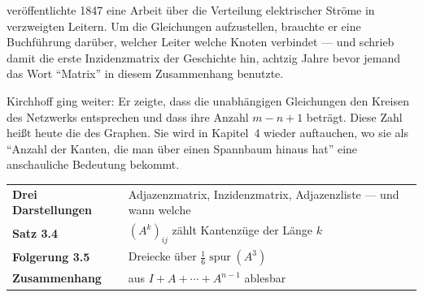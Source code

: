 \begin{geschichte}
 veröffentlichte 1847 eine Arbeit über die Verteilung elektrischer Ströme in verzweigten Leitern. Um die Gleichungen aufzustellen, brauchte er eine Buchführung darüber, welcher Leiter welche Knoten verbindet --- und schrieb damit die erste Inzidenzmatrix der Geschichte hin, achtzig Jahre bevor jemand das Wort \enquote{Matrix} in diesem Zusammenhang benutzte.

Kirchhoff ging weiter: Er zeigte, dass die unabhängigen Gleichungen den Kreisen des Netzwerks entsprechen und dass ihre Anzahl $m - n + 1$ beträgt. Diese Zahl heißt heute die  des Graphen. Sie wird in Kapitel~4 wieder auftauchen, wo sie als \enquote{Anzahl der Kanten, die man über einen Spannbaum hinaus hat} eine anschauliche Bedeutung bekommt.

\begin{center}
\begin{minipage}{0.9\textwidth}
\end{minipage}
\end{center}
\end{geschichte}

\begin{merksatz}
\begin{center}
\renewcommand{\arraystretch}{1.5}
\begin{tabular}{@{}P{3.0cm}P{5.6cm}@{}}
\toprule
\textbf{Drei Darstellungen} & Adjazenzmatrix, Inzidenzmatrix, Adjazenzliste --- und wann welche\\
\textbf{Satz 3.4} & $(A^k)_{ij}$ zählt Kantenzüge der Länge $k$\\
\textbf{Folgerung 3.5} & Dreiecke über $\frac{1}{6}\operatorname{spur}(A^3)$\\
\textbf{Zusammenhang} & aus $I + A + \cdots + A^{n-1}$ ablesbar\\
\bottomrule
\end{tabular}
\end{center}

\begin{center}
\begin{minipage}{0.88\textwidth}
\end{minipage}
\end{center}
\end{merksatz}
